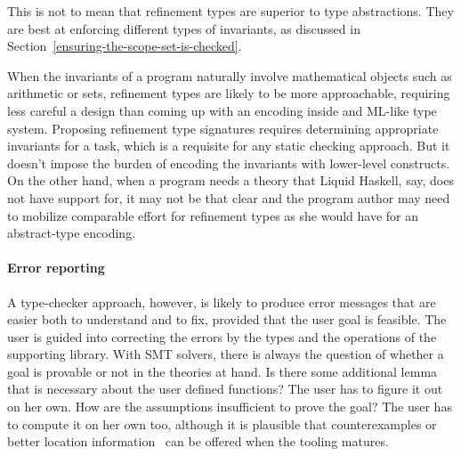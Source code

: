 \documentclass[sigconf]{acmart}
\begin{document}
This is not to mean that refinement types are superior to type abstractions.
They are best at enforcing different types of invariants, as discussed in
Section~\ref{ensuring-the-scope-set-is-checked}.

When the invariants of a program naturally involve mathematical objects such as
arithmetic or sets, refinement types are likely to be more approachable,
requiring less careful a design than coming up with an encoding inside and
ML-like type system. Proposing refinement type signatures requires
determining appropriate invariants for a task, which is a requisite for any static
checking approach. But it doesn't impose the burden of encoding the invariants with lower-level
constructs. On the other hand, when a program needs a theory that Liquid
Haskell, say, does not have support for, it may not be that clear and the program
author may need to mobilize comparable effort for refinement types as she would
have for an abstract-type encoding.

\paragraph{Error reporting} A type-checker approach, however, is likely to produce error messages that
are easier both to understand and to fix, provided that the user goal is feasible.
The user is guided into correcting the errors
by the types and the operations of the supporting library. With SMT solvers,
there is always the question of whether a goal is provable or not in the
theories at hand. Is there some additional lemma that is necessary about the user defined
functions? The user has to figure it out on her own. How are the assumptions
insufficient to prove the goal? The user has to compute it on her own too,
although it is plausible that counterexamples or better location information~\cite{webbers24}
can be offered when the tooling matures.
\end{document}
